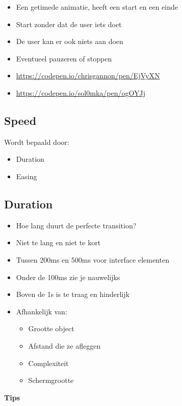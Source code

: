 \documentclass{article}
\newcommand{\bold}[1]{\textbf{#1}}
\begin{document}
\begin{itemize}
    \item Een getimede animatie, heeft een start en een einde
    \item Start zonder dat de user iets doet
    \item De user kan er ook niets aan doen
    \item Eventueel pauzeren of stoppen
    \item \url{https://codepen.io/chrisgannon/pen/EjVyXN}
    \item \url{https://codepen.io/sol0mka/pen/ogOYJj}
\end{itemize}



\subsection{Speed}

Wordt bepaald door: 

\begin{itemize}
    \item Duration
    \item Easing
\end{itemize}

\subsection{Duration}

\begin{itemize}
    \item Hoe lang duurt de perfecte transition?
    \item Niet te lang en niet te kort
    \item Tussen 200ms en 500ms voor interface elementen
    \item Onder de 100ms zie je nauwelijks
    \item Boven de 1s is te traag en hinderlijk
    \item Afhankelijk van:
    \begin{itemize}
        \item Grootte object
        \item Afstand die ze afleggen
        \item Complexiteit
        \item Schermgrootte
    \end{itemize}
\end{itemize}

\bold{Tips}
\end{document}

